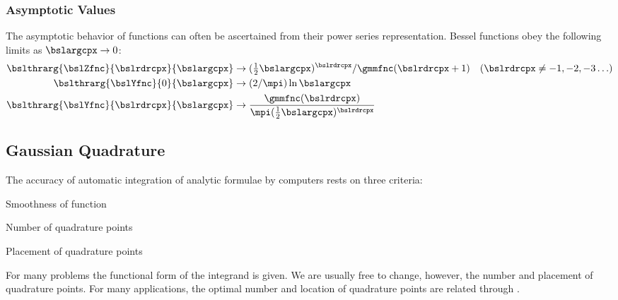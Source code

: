 \documentclass[12pt]{article}
\begin{document}
\subsubsection[Asymptotic Values]{Asymptotic Values}\label{sxn:bsl_asm}
The asymptotic behavior of functions can often be ascertained from
their power series representation.
Bessel functions obey the following limits as $\bslargcpx \to 0$:
\begin{subequations}
\begin{align}
\bslthrarg{\bslZfnc}{\bslrdrcpx}{\bslargcpx} & \to 
(\tfrac{1}{2}\bslargcpx)^{\bslrdrcpx}/\gmmfnc(\bslrdrcpx+1) 
\quad (\bslrdrcpx \neq -1, -2, -3 \ldots) \\
\bslthrarg{\bslYfnc}{0}{\bslargcpx} & \to (2/\mpi)\ln\bslargcpx \\
\bslthrarg{\bslYfnc}{\bslrdrcpx}{\bslargcpx} & \to 
\frac{\gmmfnc(\bslrdrcpx)}{\mpi(\tfrac{1}{2}\bslargcpx)^{\bslrdrcpx}}
\label{eqn:bsl_asm_zro_dfn}
\end{align}
\end{subequations}

\subsection{Gaussian Quadrature}\label{sxn:gss}
The accuracy of automatic integration of analytic formulae by
computers rests on three criteria: 
\begin{enumerate*}
\item Smoothness of function
\item Number of quadrature points
\item Placement of quadrature points
\end{enumerate*}
For many problems the functional form of the integrand is given.
We are usually free to change, however, the number and placement of
quadrature points.
For many applications, the optimal number and location of quadrature
points are related through .
\end{document}

